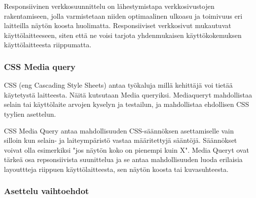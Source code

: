 \documentclass[11pt,a4paper,titlepage,oneside]{article}
\begin{document}
Responsiivinen verkkosuunnittelu on lähestymistapa verkkosivustojen rakentamiseen,
jolla varmistetaan niiden optimaalinen ulkoasu ja toimivuus eri laitteilla näytön koosta huolimatta.\citemissing
Responsiiviset verkkosivut mukautuvat käyttölaitteeseen, siten että ne voisi tarjota yhdenmukaisen käyttökokemuksen käyttölaitteesta riippumatta.
\medskip





\subsubsection{CSS Media query}


CSS (eng Cascading Style Sheets) antaa työkaluja millä kehittäjä voi tietää käytetystä laitteesta.
Näitä kutsutaan Media queryiksi.
Mediaqueryt mahdollistaa selain tai käyttölaite arvojen kyselyn ja testailun, ja mahdollistaa ehdollisen CSS tyylien asettelun.

\medskip




CSS Media Query antaa mahdollisuuden CSS-säännöksen asettamiselle vain silloin kun selain- ja laiteympäristö vastaa määritettyjä sääntöjä. 
Säännökset voivat olla esimerkiksi "jos näytön koko on pienempi kuin X".
Media Queryt ovat tärkeä osa repsonsiivista suunittelua ja se antaa mahdollisuuden luoda erilaisia layouttteja riippuen käyttölaitteesta,
sen näytön koosta tai kuvasuhteesta.












\subsubsection{Asettelu vaihtoehdot}
\end{document}
